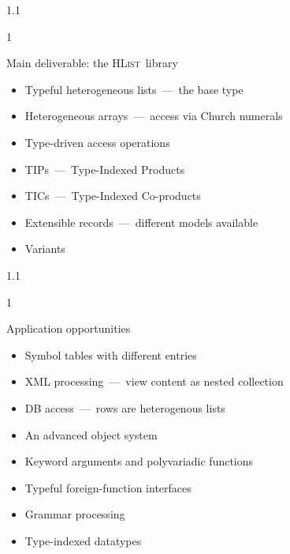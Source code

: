 \documentclass{slides}
\newenvironment{myslide}{\begin{slide}\color{Blue}\begin{boxedminipage}{1.1\hsize}\begin{boxedminipage}{1\hsize}\color{Black}
\vspace{-170\in}
}{%
\smallskip
\end{boxedminipage}
\end{boxedminipage}
\end{slide}}
\newenvironment{myslide}{\begin{slide}
}{%
\end{slide}}
\newenvironment{myslide}{\begin{slide}\color{White}\begin{boxedminipage}{1.1\hsize}\color{Black}
\vspace{-170\in}
}{%
\smallskip
\end{boxedminipage}
\end{slide}}
\newcommand{\littleskip}{\topsep8pt \parskip8pt \partopsep8pt}
\newcommand{\header}[1]{{\large \color{Red} #1}}
\newcommand{\HList}{\textsc{HList}}
\begin{document}
\begin{myslide}

\header{Main deliverable: the \HList\ library}

{\small

\littleskip\begin{itemize}
\item Typeful heterogeneous lists~---~the base type
\item Heterogeneous arrays~---~access via Church numerals
\item Type-driven access operations
\item TIPs~---~Type-Indexed Products
\item TICs~---~Type-Indexed Co-products
\item Extensible records~---~different models available
\item Variants
\end{itemize}

}

\end{myslide}






\begin{myslide}

\header{Application opportunities}

{\small

\littleskip\begin{itemize}
\item Symbol tables with different entries
\item XML processing~---~view content as nested collection
\item DB access~---~rows are heterogenous lists
\item An advanced object system
\item Keyword arguments and polyvariadic functions
\item Typeful foreign-function interfaces
\item Grammar processing
\item Type-indexed datatypes
\end{itemize}

}

\end{myslide}



\end{document}
